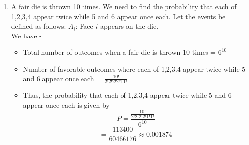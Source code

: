 \begin{enumerate}
\begin{mynote}
\begin{figure}[H]
    \end{figure}
    \end{mynote}
    \item A fair die is thrown 10 times. We need to find the probability that each of 1,2,3,4 appear twice while 5 and 6 appear once each. 
    Let the events be defined as follows:
    $A_i$: Face $i$ appears on the die. \\
    We have -
    \begin{itemize}
        \item Total number of outcomes when a fair die is thrown 10 times = $6^{10}$
        \item Number of favorable outcomes where each of 1,2,3,4 appear twice while 5 and 6 appear once each = $\frac{10!}{2!2!2!2!1!1!}$
        \item Thus, the probability that each of 1,2,3,4 appear twice while 5 and 6 appear once each is given by -
        \[P = \frac{\frac{10!}{2!2!2!2!1!1!}}{6^{10}}\]
        \[\boxed{= \frac{113400}{60466176} \approx 0.001874
        }\]
    \end{itemize}
\end{enumerate}
